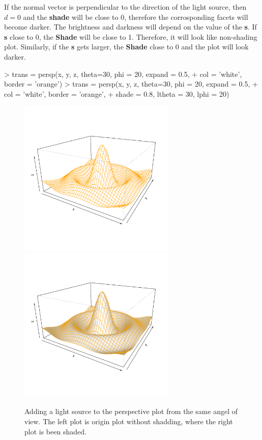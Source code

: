 \documentclass[paper=a4, fontsize=11pt]{report}
\begin{document}
If the normal vector is perpendicular to the direction of the light source, then $d = 0$ and the \textbf{shade} will be close to 0, therefore the corrosponding facets will become darker. The brightness and darkness will depend on the value of the \textbf{s}. If \textbf{s} close to 0, the \textbf{Shade} will be close to 1. Therefore, it will look like non-shading plot. Similarly, if the \textbf{s} gets larger, the \textbf{Shade} close to 0 and the plot will look darker.

\begin{Schunk}
\begin{Sinput}
> trans = persp(x, y, z, theta=30, phi = 20, expand = 0.5,
+               col = 'white', border = 'orange')
> trans = persp(x, y, z, theta=30, phi = 20, expand = 0.5,
+               col = 'white', border = 'orange', 
+               shade = 0.8, ltheta = 30, lphi = 20)
\end{Sinput}
\end{Schunk}


\begin{figure}[h]
	\begin{center}
		\includegraphics[height = 7.5cm, width = 7.5cm]{figure/Lighting_1.pdf}
		\includegraphics[height = 7.5cm, width = 7.5cm]{figure/Lighting_2.pdf}
		\caption{Adding a light source to the perspective plot from the same angel of view. The left plot is origin plot without shadding, where the right plot is been shaded.}
		\label{figure_3.3}
	\end{center}
\end{figure}
\end{document}
